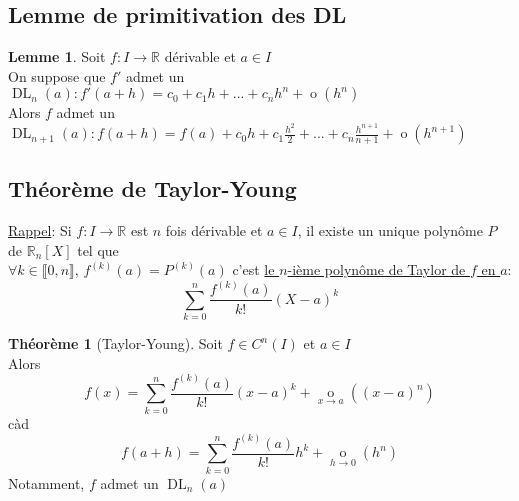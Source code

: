 \documentclass[10pt,a4paper]{article}
\theoremstyle{definition}
\newtheorem{theorem}[proposition]{Théorème}
\newtheorem{lemme}[proposition]{Lemme}
\DeclareMathOperator*{\negl}{o}
\DeclareMathOperator{\dl}{DL}
\begin{document}
\subsection{Lemme de primitivation des DL}
\begin{lemme}
Soit $f: I \to \mathbb{R}$ dérivable et $a \in I$ \\
On suppose que $f'$ admet un $\dl_n(a): f'(a + h) = c_0 + c_1 h + ... + c_n h^n + \negl(h^n)$ \\
Alors $f$ admet un $\dl_{n + 1}(a): f(a + h) = f(a) + c_0 h + c_1 \frac{h^2}{2} + ... + c_n \frac{h^{n + 1}}{n + 1} + \negl(h^{n + 1})$
\end{lemme}

\subsection{Théorème de Taylor-Young}
\noindent \uline{Rappel}: Si $f: I \to \mathbb{R}$ est $n$ fois dérivable et $a \in I$, il existe un unique polynôme $P$ de $\mathbb{R}_n[X]$ tel que \\
$\forall k \in \llbracket 0, n \rrbracket$, $f^{(k)}(a) = P^{(k)}(a)$ c'est \uline{le $n$-ième polynôme de Taylor de $f$ en $a$}:
\[\sum\limits_{k = 0}^{n} \frac{f^{(k)}(a)}{k!} (X - a)^k\]
\begin{theorem}[Taylor-Young]
Soit $f \in C^n(I)$ et $a \in I$ \\
Alors
\[ f(x) = \sum_{k = 0}^n \frac{f^{(k)}(a)}{k!} (x - a)^k + \negl\limits_{x \to a}((x - a)^n)\]
càd
\[ f(a + h) = \sum_{k = 0}^n \frac{f^{(k)}(a)}{k!} h^k + \negl\limits_{h \to 0}(h^n)\]
Notamment, $f$ admet un $\dl_n(a)$
\end{theorem}
\end{document}

